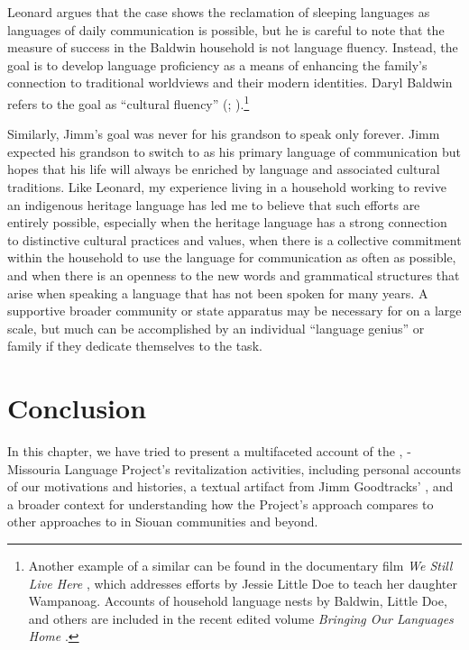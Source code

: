 \documentclass[output=paper]{LSP/langsci}
\begin{document}
Leonard argues that the  case shows the reclamation of sleeping languages as languages of daily communication is possible, but he is careful to note that the measure of success in the Baldwin household is not  language fluency. Instead, the goal is to develop language proficiency as a means of enhancing the family's connection to traditional worldviews and their modern  identities. Daryl Baldwin refers to the goal as ``cultural fluency'' (\citealt[36--37]{Leonard2007}; \citeyear[139--140]{Leonard2011}).\footnote{Another example of a similar  can be found in the documentary film \emph{We Still Live Here} \citep{Makepeace2011}, which addresses efforts by Jessie Little Doe to teach her daughter Wampanoag. Accounts of household language nests by Baldwin, Little Doe, and others are included in the recent edited volume \emph{Bringing Our Languages Home} \citep{Hinton2013}.} 

Similarly, Jimm's goal was never for his grandson to speak only  forever. Jimm expected his grandson to switch to  as his primary language of communication but hopes that his life will always be enriched by  language and associated cultural traditions. Like Leonard, my experience living in a household working to revive an indigenous heritage language has led me to believe that such efforts are entirely possible, especially when the heritage language has a strong connection to distinctive cultural practices and values, when there is a collective commitment within the household to use the language for communication as often as possible, and when there is an openness to the new words and grammatical structures that arise when speaking a language that has not been spoken for many years. A supportive broader community or state apparatus may be necessary for  on a large scale, but much can be accomplished by an individual ``language genius'' or family if they dedicate themselves to the task.

\section{Conclusion}
In this chapter, we have tried to present a multifaceted account of the , -Missouria Language Project's  revitalization activities, including personal accounts of our motivations and histories, a textual artifact from Jimm Goodtracks'  , and a broader context for understanding how the Project's approach compares to other approaches to  in Siouan communities and beyond.
\end{document}
